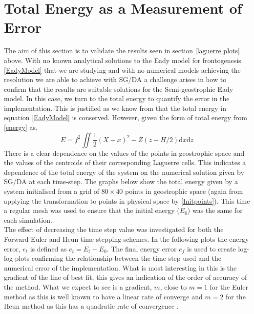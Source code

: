 \section{Total Energy as a Measurement of Error}
The aim of this section is to validate the results seen in section \ref{laguerre plots} above. With no known analytical solutions to the Eady model for frontogenesis \ref{EadyModel} that we are studying and with no numerical models achieving the resolution we are able to achieve with SG/DA a challenge arises in how to confirm that the results are suitable solutions for the Semi-geostrophic Eady model. In this case, we turn to the total energy to quantify the error in the implementation. This is justified as we know from \cite{Cullen2006a} that the total energy in equation \ref{EadyModel} is conserved. However, given the form of total energy from \ref{energy} as,
\begin{equation}
	E = f^2 \iint \frac{1}{2}\left(X-x\right)^2 - Z\left(z - H/2\right)\textrm{d}x\textrm{d}z
\end{equation}
There is a clear dependence on the values of the points in geostrophic space and the values of the centroids of their corresponding Laguerre cells. This indicates a dependence of the total energy of the system on the numerical solution given by SG/DA at each time-step. The graphs below show the total energy given by a system initialised from a grid of $80 \times 40$ points in geostrophic space (again from applying the transformation to points in physical space by \ref{Initpoints}). This time a regular mesh was used to ensure that the initial energy ($E_0$) was the same for each simulation. \\
\linebreak
The effect of decreasing the time step value was investigated for  both the Forward Euler and Heun time stepping schemes. In the following plots the energy error, $e_t$ is defined as $e_t = E_{t} - E_0$. The final energy error $e_f$ is used to create log-log plots confirming the relationship between the time step used and the numerical error of the implementation. What is most interesting in this is the gradient of the line of best fit, this gives an indication of the order of accuracy of the method. What we expect to see is a gradient, $m$, close to $m=1$ for the Euler method as this is well known to have a linear rate of converge \cite{Griffiths2010} and $m=2$ for the Heun method as this has a quadratic rate of convergence \cite{Griffiths2010}.\pagebreak
